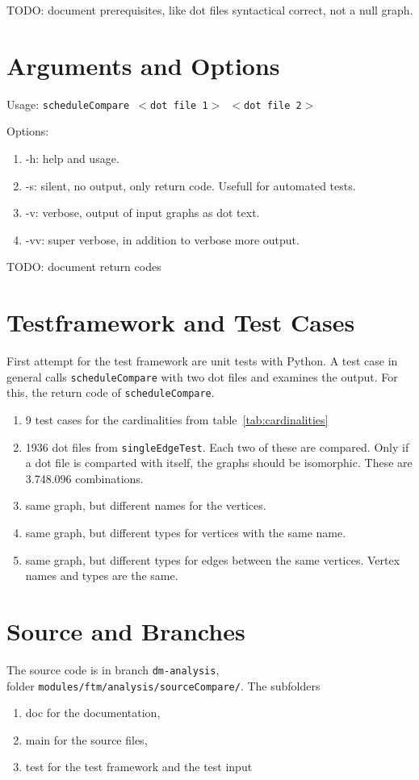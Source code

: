 \documentclass[12pt,a4paper]{report}
\begin{document}
TODO: document prerequisites, like dot files syntactical correct, not a null graph.
\chapter{Arguments and Options}
Usage: \texttt{scheduleCompare $<$dot file 1$>$ $<$dot file 2$>$}

Options:
\begin{enumerate}
	\item -h: help and usage.
	\item -s: silent, no output, only return code. Usefull for automated tests.
	\item -v: verbose, output of input graphs as dot text.
	\item -vv: super verbose, in addition to verbose more output.
\end{enumerate}

TODO: document return codes
\chapter{Testframework and Test Cases}
First attempt for the test framework are unit tests with Python. A test case in general calls \texttt{scheduleCompare} with two dot files and examines the output. For this, the return code of \texttt{scheduleCompare}.

\begin{enumerate}
	\item 9 test cases for the cardinalities from table~\ref{tab:cardinalities}
	\item 1936 dot files from \texttt{singleEdgeTest}. Each two of these are compared. Only if a dot file is comparted with itself, the graphs should be isomorphic. These are 3.748.096 combinations.
	\item same graph, but different names for the vertices.
	\item same graph, but different types for vertices with the same name.
	\item same graph, but different types for edges between the same vertices. Vertex names and types are the same.
\end{enumerate}

\chapter{Source and Branches}
The source code is in branch \texttt{dm-analysis}, \\ 
folder \texttt{modules/ftm/analysis/sourceCompare/}. The subfolders
\begin{enumerate}
	\item doc for the documentation,
	\item main for the source files,
	\item test for the test framework and the test input
\end{enumerate}
\end{document}
